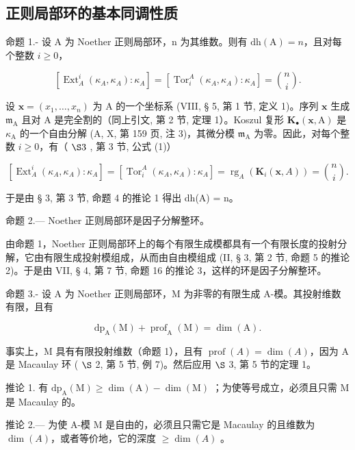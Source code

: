 \subsection{正则局部环的基本同调性质}

命题 1.- 设 A 为 Noether 正则局部环，n 为其维数。则有 \(\mathrm{dh(A)} = n\)，且对每个整数 \(i \geqslant 0\)，

\[
\left[ \operatorname{Ext} _ {A} ^ {i} \left(\kappa_ {A}, \kappa_ {A}\right): \kappa_ {A} \right] = \left[ \operatorname{Tor} _ {i} ^ {A} \left(\kappa_ {A}, \kappa_ {A}\right): \kappa_ {A} \right] = \binom {n} {i}.
\]

设 \(\mathbf{x} = (x_{1},\ldots ,x_{n})\) 为 A 的一个坐标系 (VIII, § 5, 第 1 节, 定义 1)。序列 \(\mathbf{x}\) 生成 \(\mathfrak{m}_{\mathrm{A}}\) 且对 A 是完全割的（同上引文, 第 2 节, 定理 1）。Koszul 复形 \(\mathbf{K}_{\bullet}(\mathbf{x},\mathrm{A})\) 是 \(\kappa_{\mathrm{A}}\) 的一个自由分解 (A, X, 第 159 页, 注 3)，其微分模 \(\mathfrak{m}_{\mathrm{A}}\) 为零。因此，对每个整数 \(i\geqslant 0\)，有（ \(\S 3\) , 第 3 节, 公式 (1)）

\[
\left[ \operatorname{Ext} _ {A} ^ {i} (\kappa_ {A}, \kappa_ {A}): \kappa_ {A} \right] = \left[ \operatorname{Tor} _ {i} ^ {A} (\kappa_ {A}, \kappa_ {A}): \kappa_ {A} \right] = \operatorname{rg} _ {A} (\mathbf {K} _ {i} (\mathbf {x}, A)) = \binom {n} {i}.
\]

于是由 § 3, 第 3 节, 命题 4 的推论 1 得出 dh(A) = n。

命题 2.--- Noether 正则局部环是因子分解整环。

由命题 1，Noether 正则局部环上的每个有限生成模都具有一个有限长度的投射分解，它由有限生成投射模组成，从而由自由模组成 (II, § 3, 第 2 节, 命题 5 的推论 2)。于是由 VII, § 4, 第 7 节, 命题 16 的推论 3，这样的环是因子分解整环。

命题 3.- 设 A 为 Noether 正则局部环，M 为非零的有限生成 A-模。其投射维数有限，且有

\[
\mathrm{dp} _ {\mathrm{A}} (\mathrm{M}) + \operatorname{prof} _ {\mathrm{A}} (\mathrm{M}) = \dim (\mathrm{A}).
\]

事实上，M 具有有限投射维数（命题 1），且有 \(\operatorname{prof}(A) = \dim(A)\)，因为 A 是 Macaulay 环 ( \(\S\) 2, 第 5 节, 例 7)。然后应用 \(\S\) 3, 第 5 节的定理 1。

推论 1. 有 \(\mathrm{dp}_{\mathrm{A}}(\mathrm{M}) \geqslant \dim(\mathrm{A}) - \dim(\mathrm{M})\) ；为使等号成立，必须且只需 M 是 Macaulay 的。

推论 2.--- 为使 A-模 M 是自由的，必须且只需它是 Macaulay 的且维数为 \(\dim(A)\)，或者等价地，它的深度 \(\geqslant \dim(A)\) 。


